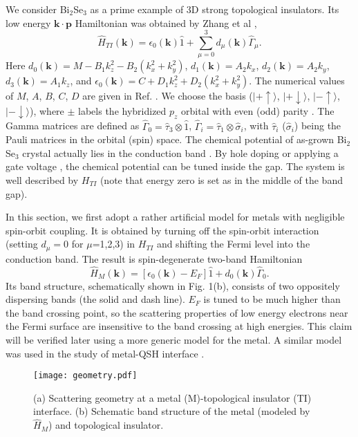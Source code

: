\documentclass[11pt,revtex,aps]{report}
\def\v#1{\mathbf{#1}}
\def\ket#1{\vert #1 \rangle}
\begin{document}
We consider Bi$_2$Se$_3$ as a prime example of 3D strong topological insulators. Its low energy $\mathbf{k\cdot p}$ Hamiltonian was obtained by Zhang et al \cite{zhang2009},
\[
\hat{H}_{TI}(\v{k})=\epsilon_0(\v{k})\hat{1}+\sum_{\mu=0}^{3}d_\mu(\v{k})\hat{\Gamma}_\mu.
\]
Here $d_0(\v{k})=M-B_1k^2_z-B_2(k_x^2+k_y^2)$, $d_1(\v{k})=A_2 k_x$, $d_2(\v{k})=A_2 k_y$, $d_3(\v{k})=A_1 k_z$, and $\epsilon_0(\v{k})=C+D_1k_z^2+D_2(k_x^2+k_y^2)$. The numerical values of $M$, $A$, $B$, $C$, $D$ are given in Ref. 
\cite{zhang2009}.
We choose the basis ($\ket{+\uparrow}$, $\ket{+\downarrow}$, $\ket{-\uparrow}$,$\ket{-\downarrow}$), where $\pm$ labels the hybridized $p_z$ orbital with even (odd) parity \cite{zhang2009}. The Gamma matrices are defined as
$\hat{\Gamma}_0=\hat{\tau}_3\otimes \hat{1}$, $\hat{\Gamma}_i=\hat{\tau}_1\otimes \hat{\sigma}_i$, with
$\hat{\tau}_i$ ($\hat{\sigma}_i$) being the Pauli matrices in the orbital (spin) space.
The chemical potential of as-grown Bi$_2$Se$_3$ crystal actually lies in the conduction 
band \cite{Hsieh2009}. By hole doping \cite{Hsieh2009} 
or applying a gate voltage \cite{gate}, the chemical potential can be tuned inside 
the gap. The system is well described by $H_{TI}$ (note that energy zero is set as 
in the middle of the band gap).

In this section, we first adopt a rather artificial model for metals with negligible 
spin-orbit coupling. It is
obtained by turning off the spin-orbit interaction (setting $d_\mu=0$ for $\mu$=1,2,3) 
in $H_{TI}$ and shifting the Fermi level into 
the conduction band. The result is spin-degenerate two-band Hamiltonian
\[
\hat{H}_M(\v{k})=[\epsilon_0(\v{k})-E_F]\hat{1}+d_0(\v{k})\hat{\Gamma}_0.
\]
Its band structure, schematically shown in Fig. 1(b), consists of two oppositely dispersing bands 
(the solid and dash line). $E_F$ is tuned to be much higher than the band crossing point, so
the scattering properties of low energy electrons near the Fermi surface are 
insensitive to the band crossing at high energies. This claim will be verified later using a
more generic model for the metal. A similar model was used in the study of metal-QSH interface \cite{yokoyama09}.


\begin{figure}
\center
\texttt{[image: geometry.pdf]}
\caption{(a) Scattering geometry at a metal (M)-topological insulator (TI) interface.
(b) Schematic band structure of the metal (modeled by $\hat{H}_M$) and topological insulator.
}
\end{figure}
\end{document}
